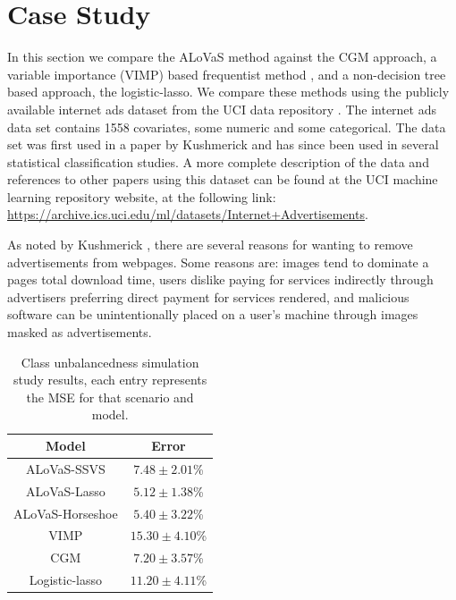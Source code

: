 \section{Case Study}\label{sec:real_data}

In this section we compare the ALoVaS method against the CGM approach, a variable importance (VIMP) based frequentist method \cite{ishwaran2010high}, and a non-decision tree based approach, the logistic-lasso. We compare these methods using the publicly available internet ads dataset from the UCI data repository \cite{Frank:2010uq}. The internet ads data set contains 1558 covariates, some numeric and some categorical. The data set was first used in a paper by Kushmerick \cite{kushmerick1999learning} and has since been used in several statistical classification studies. A more complete description of the data and references to other papers using this dataset can be found at the UCI machine learning repository website, at the following link: \url{https://archive.ics.uci.edu/ml/datasets/Internet+Advertisements}.

As noted by Kushmerick \cite{kushmerick1999learning}, there are several reasons for wanting to remove advertisements from webpages. Some reasons are: images tend to dominate a pages total download time, users dislike paying for services indirectly through advertisers preferring direct payment for services rendered, and malicious software can be unintentionally placed on a user's machine through images masked as advertisements. 

		\begin{table}[H]
\begin{center}
\begin{tabular}{|c|c|} \hline
Model & Error \\ \hline
ALoVaS-SSVS&$7.48 \pm 2.01$\%\\ \hline
ALoVaS-Lasso &$5.12 \pm 1.38$\% \\ \hline
ALoVaS-Horseshoe& $5.40 \pm 3.22$\% \\ \hline
VIMP& $15.30 \pm 4.10$\%\\ \hline
CGM& $7.20 \pm 3.57$\%\\ \hline
Logistic-lasso&$11.20 \pm 4.11$\%\\ \hline
\end{tabular}
\caption{Class unbalancedness simulation study results, each entry represents the MSE for that scenario and model. }
\label{tab:ads_misclass}
\end{center}
\end{table}

